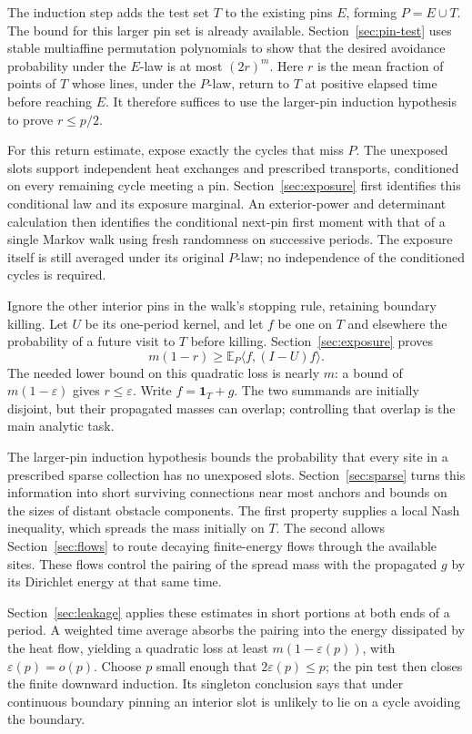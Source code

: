 The induction step adds the test set $T$ to the existing pins $E$,
forming $P=E\cup T$.  The bound for this larger pin set is already
available.  Section~\ref{sec:pin-test} uses stable multiaffine
permutation polynomials to show that the desired avoidance probability
under the $E$-law is at most $(2r)^m$.  Here $r$ is the mean fraction
of points of $T$ whose lines, under the $P$-law, return to $T$ at
positive elapsed time before reaching $E$.  It therefore suffices to
use the larger-pin induction hypothesis to prove $r\le p/2$.

For this return estimate, expose exactly the cycles that miss $P$.
The unexposed slots support independent heat exchanges and prescribed
transports, conditioned on every remaining cycle meeting a pin.
Section~\ref{sec:exposure} first identifies this conditional law and
its exposure marginal.  An exterior-power and determinant calculation
then identifies the conditional next-pin first moment with that of a
single Markov walk using fresh randomness on successive periods.
The exposure itself is still averaged under its original $P$-law;
no independence of the conditioned cycles is required.

Ignore the other interior pins in the walk's stopping rule, retaining
boundary killing.  Let $U$ be its one-period kernel, and let $f$ be one
on $T$ and elsewhere the probability of a future visit to $T$ before
killing.  Section~\ref{sec:exposure} proves
\[
                 m(1-r)\ge\mathbb E_P\langle f,(I-U)f\rangle.
\]
The needed lower bound on this quadratic loss is nearly $m$: a bound
of $m(1-\varepsilon)$ gives $r\le\varepsilon$.  Write
$f=\mathbf1_T+g$.  The two summands are initially disjoint, but their
propagated masses can overlap; controlling that overlap is the main
analytic task.

The larger-pin induction hypothesis bounds the probability that every
site in a prescribed sparse collection has no unexposed slots.
Section~\ref{sec:sparse} turns this information into
short surviving connections near most anchors and bounds on the sizes
of distant obstacle components.  The first property supplies a local
Nash inequality, which spreads the mass initially on $T$.  The second
allows Section~\ref{sec:flows} to route decaying finite-energy flows
through the available sites.  These flows control the pairing of the
spread mass with the propagated $g$ by its Dirichlet energy at that
same time.

Section~\ref{sec:leakage} applies these estimates in short portions at
both ends of a period.  A weighted time average absorbs the pairing
into the energy dissipated by the heat flow, yielding a quadratic loss
at least $m(1-\varepsilon(p))$, with $\varepsilon(p)=o(p)$.  Choose
$p$ small enough that $2\varepsilon(p)\le p$; the pin test then closes
the finite downward induction.  Its singleton conclusion says that
under continuous boundary pinning an interior slot is unlikely to lie
on a cycle avoiding the boundary.

